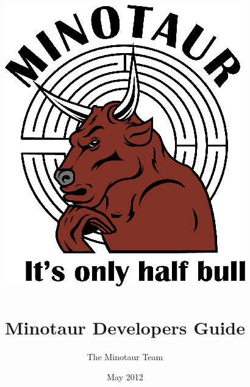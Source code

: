 \title {
\includegraphics[scale=1.0]{../logo/Minotaur.eps} \\
$\;$\\
Minotaur Developers Guide
}
\author{The Minotaur Team}
\date{May 2012} 

